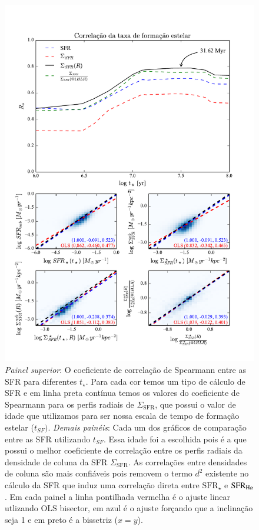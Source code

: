 \begin{figure}
	\centering
	\includegraphics[scale=0.7, clip]{figuras/Rs_allSFR.pdf}
	\caption[Comparação entre as SFR.]
	{\emph{Painel superior}: O coeficiente de correlação de Spearmann entre as SFR para diferentes
$t_\star$. Para cada cor temos um tipo de cálculo de SFR e em linha preta contínua temos os valores
do coeficiente de Spearmann para os perfis radiais de $\Sigma_{\mathrm{SFR}}$, que possui o valor de
idade que utilizamos para ser nossa escala de tempo de formação estelar ($t_{SF})$. \emph{Demais
painéis}: Cada um dos gráficos de comparação entre as SFR utilizando $t_{SF}$. Essa idade foi a
escolhida pois é a que possui o melhor coeficiente de correlação entre os perfis radiais da
densidade de coluna da SFR $\Sigma_{\mathrm{SFR}}$. As correlações entre densidades de coluna são
mais confiáveis pois removem o termo $d^2$ existente no cálculo da SFR que induz uma correlação
direta entre $\mathrm{SFR}_\star$ e $\mathrm{SFR}_{\Halpha}$. Em cada painel a linha pontilhada
vermelha é o ajuste linear utlizando OLS bisector, em azul é o ajuste forçando que a inclinação
seja 1 e em preto é a bissetriz ($x = y$).}
	\label{fig:SFRsynvsneb}
\end{figure}

